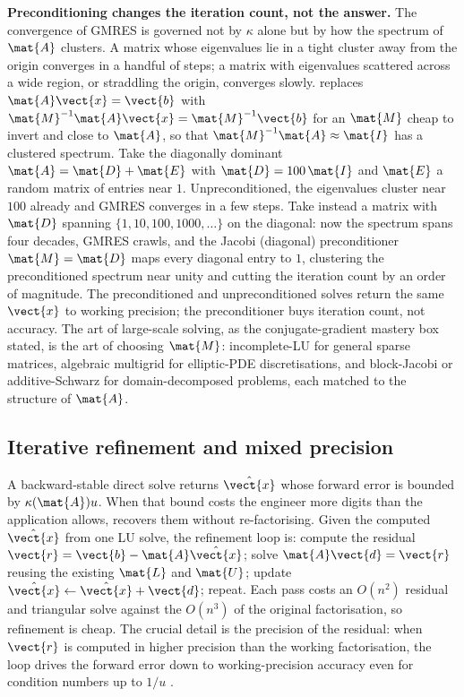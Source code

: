 \begin{example}
\textbf{Preconditioning changes the iteration count, not the answer.} The
convergence of GMRES is governed not by $\kappa$ alone but by how the
spectrum of $\mat{A}$ clusters. A matrix whose eigenvalues lie in a tight
cluster away from the origin converges in a handful of steps; a matrix with
eigenvalues scattered across a wide region, or straddling the origin,
converges slowly.  replaces $\mat{A}\vect{x} =
\vect{b}$ with $\mat{M}^{-1}\mat{A}\vect{x} = \mat{M}^{-1}\vect{b}$ for an
$\mat{M}$ cheap to invert and close to $\mat{A}$, so that $\mat{M}^{-1}
\mat{A} \approx \mat{I}$ has a clustered spectrum. Take the
diagonally dominant $\mat{A} = \mat{D} + \mat{E}$ with $\mat{D} = 100\,
\mat{I}$ and $\mat{E}$ a random matrix of entries near $1$. Unpreconditioned,
the eigenvalues cluster near $100$ already and GMRES converges in a few
steps. Take instead a matrix with $\mat{D}$ spanning $\{1, 10, 100, 1000,
\ldots\}$ on the diagonal: now the spectrum spans four decades, GMRES
crawls, and the Jacobi (diagonal) preconditioner $\mat{M} = \mat{D}$ maps
every diagonal entry to $1$, clustering the preconditioned spectrum near
unity and cutting the iteration count by an order of magnitude. The
preconditioned and unpreconditioned solves return the same
$\vect{x}$ to working precision; the preconditioner buys iteration count,
not accuracy. The art of large-scale solving, as the conjugate-gradient
mastery box stated, is the art of choosing $\mat{M}$: incomplete-LU for
general sparse matrices, algebraic multigrid for elliptic-PDE
discretisations, and block-Jacobi or additive-Schwarz for domain-decomposed
problems, each matched to the structure of $\mat{A}$.
\end{example}

\subsection{Iterative refinement and mixed precision}

A backward-stable direct solve returns $\hat{\vect{x}}$ whose forward error
is bounded by $\kappa(\mat{A}) u$. When that bound costs the engineer more
digits than the application allows,  recovers
them without re-factorising. Given the computed $\hat{\vect{x}}$ from one
LU solve, the refinement loop is: compute the residual $\vect{r} =
\vect{b} - \mat{A}\hat{\vect{x}}$; solve $\mat{A}\vect{d} = \vect{r}$ reusing
the existing $\mat{L}$ and $\mat{U}$; update $\hat{\vect{x}} \leftarrow
\hat{\vect{x}} + \vect{d}$; repeat. Each pass costs an $O(n^{2})$ residual
and triangular solve against the $O(n^{3})$ of the original factorisation,
so refinement is cheap. The crucial detail is the precision of the
residual: when $\vect{r}$ is computed in higher precision than the working
factorisation, the loop drives the forward error down to working-precision
accuracy even for condition numbers up to $1/u$
\cite[ch.~12]{text:higham-numerical}.

